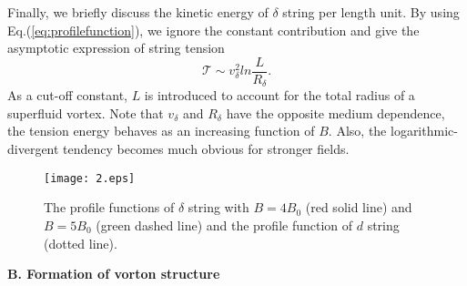\documentclass[12pt]{article}
\begin{document}
Finally, we briefly discuss the kinetic energy of $\delta$ string per length unit.
By using Eq.(\ref{eq:profilefunction}), we ignore the constant contribution and give the
asymptotic expression of string tension
\begin{equation}
  \label{eq:tension1}
  \mathcal{T} \sim v_\delta^2 ln\frac{L}{R_\delta}.
\end{equation}
As a cut-off constant, $L$ is introduced to account for the total radius of a superfluid vortex.
Note that $v_\delta$ and $R_\delta$ have the opposite medium dependence, the tension energy
behaves as an increasing function of $B$.
Also, the logarithmic-divergent tendency becomes much obvious for stronger fields.

\begin{figure}
	\texttt{[image: 2.eps]}
	\caption{The profile functions of $\delta$ string with $B = 4B_0$ (red solid line) and
    $B = 5 B_0$ (green dashed line) and the profile function of $d$ string (dotted line).}
	\label{fig:2}
\end{figure}
\vspace{0.2cm}
\textbf{B. Formation of vorton structure }
\vspace{0.2cm}
\end{document}

